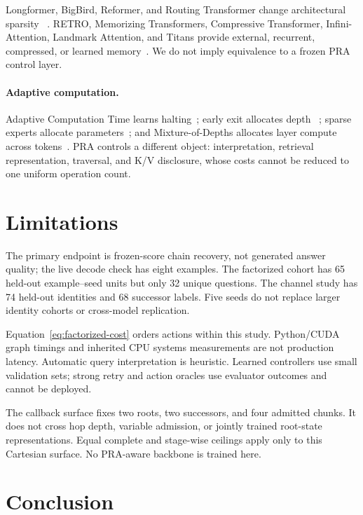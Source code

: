 \documentclass[11pt]{article}
\begin{document}
Longformer, BigBird, Reformer, and Routing Transformer change architectural sparsity
~\cite{beltagy2020longformer,zaheer2020bigbird,kitaev2020reformer,roy2021routing}. RETRO,
Memorizing Transformers, Compressive Transformer, Infini-Attention, Landmark Attention, and Titans
provide external, recurrent, compressed, or learned memory~\cite{borgeaud2022retro,wu2022memorizing,
rae2020compressive,munkhdalai2024infini,mohtashami2023landmark,behrouz2025titans}. We do not imply
equivalence to a frozen PRA control layer.

\paragraph{Adaptive computation.}
Adaptive Computation Time learns halting~\cite{graves2016adaptive}; early exit allocates depth
~\cite{xin2020deebert}; sparse experts allocate parameters~\cite{fedus2022switch}; and
Mixture-of-Depths allocates layer compute across tokens~\cite{raposo2024mixturedepths}. PRA controls
a different object: interpretation, retrieval representation, traversal, and K/V disclosure, whose
costs cannot be reduced to one uniform operation count.

\section{Limitations}

The primary endpoint is frozen-score chain recovery, not generated answer quality; the live decode
check has eight examples. The factorized cohort has 65 held-out example--seed units but only 32
unique questions. The channel study has 74 held-out identities and 68 successor labels. Five seeds
do not replace larger identity cohorts or cross-model replication.

Equation~\ref{eq:factorized-cost} orders actions within this study. Python/CUDA graph timings and
inherited CPU systems measurements are not production latency. Automatic query interpretation is
heuristic. Learned controllers use small validation sets; strong retry and action oracles use
evaluator outcomes and cannot be deployed.

The callback surface fixes two roots, two successors, and four admitted chunks. It does not cross
hop depth, variable admission, or jointly trained root-state representations. Equal complete and
stage-wise ceilings apply only to this Cartesian surface. No PRA-aware backbone is trained here.

\section{Conclusion}
\end{document}
